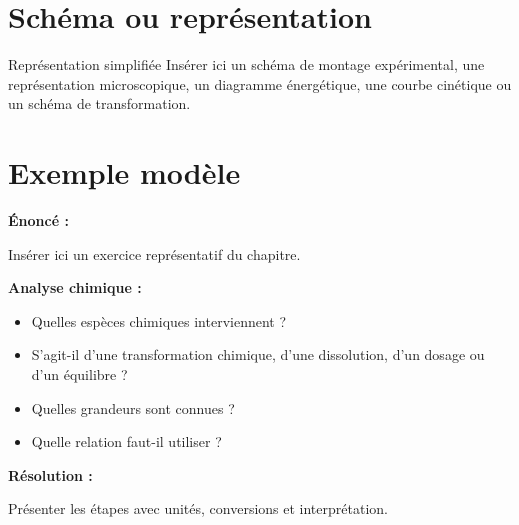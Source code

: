 \documentclass[11pt,a4paper]{article}
\begin{document}
\section{Schéma ou représentation}

\begin{cadregris}{Représentation simplifiée}
Insérer ici un schéma de montage expérimental, une représentation microscopique, un diagramme énergétique, une courbe cinétique ou un schéma de transformation.

\medskip

\begin{center}
\end{center}
\end{cadregris}

\section{Exemple modèle}

\begin{cadreexemple}
\textbf{Énoncé :}

Insérer ici un exercice représentatif du chapitre.

\medskip

\textbf{Analyse chimique :}
\begin{itemize}
    \item Quelles espèces chimiques interviennent ?
    \item S’agit-il d’une transformation chimique, d’une dissolution, d’un dosage ou d’un équilibre ?
    \item Quelles grandeurs sont connues ?
    \item Quelle relation faut-il utiliser ?
\end{itemize}

\medskip

\textbf{Résolution :}

Présenter les étapes avec unités, conversions et interprétation.
\end{cadreexemple}
\end{document}
